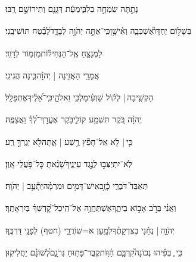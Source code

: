 \documentclass[12pt]{article}
\newcommand{\loc}[1]{\textsuperscript{\locf{#1}}}
\begin{document}
{\loc{ ח}~}‏נָתַ֣תָּה שִׂמְחָ֣ה בְלִבִּ֑י{\hfill}מֵעֵ֬ת דְּגָנָ֖ם וְתִירוֹשָׁ֣ם רָֽבּוּ׃\par

{\loc{ ט}~}‏בְּשָׁל֣וֹם יַחְדָּו֮{\hfill}אֶשְׁכְּבָ֢ה וְאִ֫ישָׁ֥ן\newline\hspace*{.5em}כִּֽי־אַתָּ֣ה יְהֹוָ֣ה לְבָדָ֑ד{\hfill}לָ֝בֶ֗טַח תּוֹשִׁיבֵֽנִי׃\par\pend
\ledpb
\pstart[\subsection*{\textcolor{red}{פרק ה}}]\label{פרק ה}
{\loc{ א}~}‏לַמְנַצֵּ֥חַ אֶֽל־הַנְּחִיל֗וֹת{\hfill}מִזְמ֥וֹר לְדָוִֽד׃\par

{\loc{ ב}~}‏אֲמָרַ֖י הַאֲזִ֥ינָה | יְהֹוָ֗ה{\hfill}בִּ֣ינָה הֲגִיגִֽי׃\par

{\loc{ ג}~}‏הַקְשִׁ֤יבָה |  לְק֬וֹל שַׁוְעִ֗י{\hfill}מַלְכִּ֥י וֵאלֹהָ֑י\newline\hspace*{.5em}כִּֽי־אֵ֝לֶ֗יךָ{\hfill}אֶתְפַּלָּֽל׃\par

{\loc{ ד}~}‏יְֽהֹוָ֗ה בֹּ֭קֶר תִּשְׁמַ֣ע קוֹלִ֑י{\hfill}בֹּ֥קֶר אֶעֱרׇךְ־לְ֝ךָ֗ וַאֲצַפֶּֽה׃\par

{\loc{ ה}~}‏כִּ֤י |  לֹ֤א אֵֽל־חָפֵ֘ץ רֶ֥שַׁע | אָ֑תָּה{\hfill}לֹ֖א יְגֻרְךָ֣ רָֽע׃\par

{\loc{ ו}~}‏לֹֽא־יִתְיַצְּב֣וּ  לְנֶ֣גֶד עֵינֶ֑יךָ{\hfill}שָׂ֝נֵ֗אתָ כׇּל־פֹּ֥עֲלֵי אָֽוֶן׃\par

{\loc{ ז}~}‏תְּאַבֵּד֮ דֹּבְרֵ֢י כָ֫זָ֥ב{\hfill}אִישׁ־דָּמִ֥ים וּמִרְמָ֗ה{\hfill}יְתָ֘עֵ֥ב | יְהֹוָֽה׃\par

{\loc{ ח}~}‏וַאֲנִ֗י בְּרֹ֣ב  אָב֣וֹא בֵיתֶ֑ךָ{\hfill}אֶשְׁתַּחֲוֶ֥ה אֶל־הֵֽיכַל־קׇ֝דְשְׁךָ֗ בְּיִרְאָתֶֽךָ׃\par

{\loc{ ט}~}‏יְהֹוָ֤ה | {\hfill}נְחֵ֬נִי בְצִדְקָתֶ֗ךָ\newline\hspace*{.5em}לְמַ֥עַן א=שׁוֹרֲרָ֑י (חטף){\hfill} לְפָנַ֣י דַּרְכֶּֽךָ׃\par

{\loc{ י}~}‏כִּ֤י ֪ בְּפִ֡יהוּ נְכוֹנָה֮{\hfill}קִרְבָּ֢ם הַ֫וּ֥וֹת\newline\hspace*{.5em}קֶֽבֶר־פָּת֥וּחַ גְּרֹנָ֑ם{\hfill}לְ֝שׁוֹנָ֗ם יַחֲלִיקֽוּן׃\par
\end{document}
